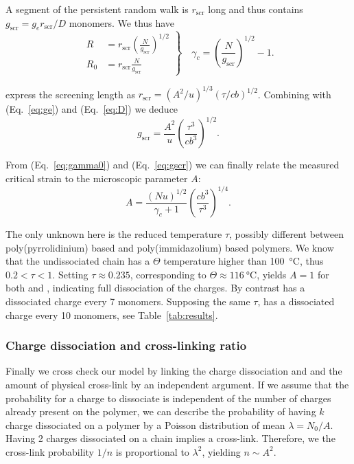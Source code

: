 \documentclass[journal=jacsat,manuscript=article]{achemso}
\begin{document}
A segment of the persistent random walk is $r_\mathrm{scr}$ long and thus contains $g_\mathrm{scr} = g_e r_\mathrm{scr}/D$ monomers. We thus have
\begin{equation}
\left. \begin{array}{ll}
R &= r_\mathrm{scr} \left(\frac{N}{g_\mathrm{scr}}\right)^{1/2}\\
R_0 &= r_\mathrm{scr} \frac{N}{g_\mathrm{scr}}
\end{array}\right\rbrace\quad
\gamma_c = \left(\frac{N}{g_\mathrm{scr}}\right)^{1/2} -1\label{eq:gamma0}.
\end{equation}

\citeauthor{Rubinstein1996} express the screening length as
$r_\mathrm{scr} = \left(A^2 / u\right)^{1/3} \left(\tau /cb \right)^{1/2}$. Combining with (Eq.~\ref{eq:ge}) and (Eq.~\ref{eq:D}) we deduce
\begin{equation}
g_\mathrm{scr} = \frac{A^2}{u} \left(\frac{\tau^3}{c b^3}\right)^{1/2}\label{eq:gscr}.
\end{equation}

From (Eq.~\ref{eq:gamma0}) and (Eq.~\ref{eq:gscr}) we can finally relate the measured critical strain to the microscopic parameter $A$:
\begin{equation}
A = \frac{\left(N u\right)^{1/2}}{\gamma_c+1}\left(\frac{c b^3}{\tau^3}\right)^{1/4}.
\label{eq:A}
\end{equation}

The only unknown here is the reduced temperature $\tau$, possibly different between poly(pyrrolidinium) based and poly(immidazolium) based polymers. We know that the undissociated chain has a $\Theta$ temperature higher than \SI{100}{\celsius}, thus $0.2<\tau<1$. Setting $\tau\approx 0.235$, corresponding to $\Theta\approx\SI{116}{\celsius}$, yields $A=1$ for both  and , indicating full dissociation of the charges. By contrast  has a dissociated charge every 7 monomers. Supposing the same $\tau$,  has a dissociated charge every 10 monomers, see Table~\ref{tab:results}.

\subsubsection{Charge dissociation and cross-linking ratio}

Finally we cross check our model by linking the charge dissociation and and the amount of physical cross-link by an independent argument. If we assume that the probability for a charge to dissociate is independent of the number of charges already present on the polymer, we can describe the probability of having $k$ charge dissociated on a polymer by a Poisson distribution of mean $\lambda = N_0/A$. Having 2 charges dissociated on a chain implies a cross-link. Therefore, we the cross-link probability $1/n$ is proportional to $\lambda^2$, yielding $n \sim A^2$.
\end{document}
